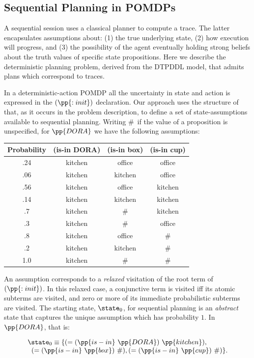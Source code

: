 \documentclass{article}
\begin{document}
\subsection{Sequential Planning in POMDPs}

A sequential session uses a classical planner to compute a trace. The
latter encapsulates assumptions about: (1) the true underlying state,
(2) how execution will progress, and (3) the possibility of the agent
eventually holding strong beliefs about the truth values of specific
state propositions. Here we describe the deterministic planning
problem, derived from the DTPDDL model, that admits plans which
correspond to traces.

In a deterministic-action POMDP all the uncertainty in state and
action is expressed in the $(\pp{:init})$ declaration. Our approach
uses the structure of that, as it occurs in the problem description,
to define a set of state-assumptions available to sequential planning.
Writing \#\ if the value of a proposition is unspecified, for
$\pp{DORA}$ we have the following assumptions:

\small
\begin{tabular}{cccc}
\hline
Probability & (is-in DORA)  & (is-in box)  & (is-in cup) \\
\hline
.24 & kitchen & office & office \\
.06 & kitchen & kitchen & office \\
.56 & kitchen & office & kitchen \\
.14 & kitchen & kitchen & kitchen \\
.7 & kitchen & \# &  kitchen\\
.3 & kitchen & \# & office \\
.8 & kitchen & office & \# \\
.2 & kitchen & kitchen & \# \\
1.0 & kitchen & \# & \# \\
\hline
\end{tabular}
\normalsize

\noindent An assumption corresponds to a {\em
relaxed} visitation of the root term of $(\pp{:init})$. In this
relaxed case, a conjunctive term is visited iff its atomic subterms
are visited, and zero or more of its immediate probabilistic subterms
are visited. The starting state, $\state_0$, for sequential planning
is an {\em abstract} state that captures the unique assumption which
has probability $1$. In $\pp{DORA}$, that is:

\[
\begin{array}{l}
\state_0 \equiv \{(=(\pp{is-in}~\pp{DORA})~\pp{kitchen}),\\
\;\;(=(\pp{is-in}~\pp{box})~\#), (=(\pp{is-in}~\pp{cup})~\#)\}.
\end{array}
\]
\end{document}
